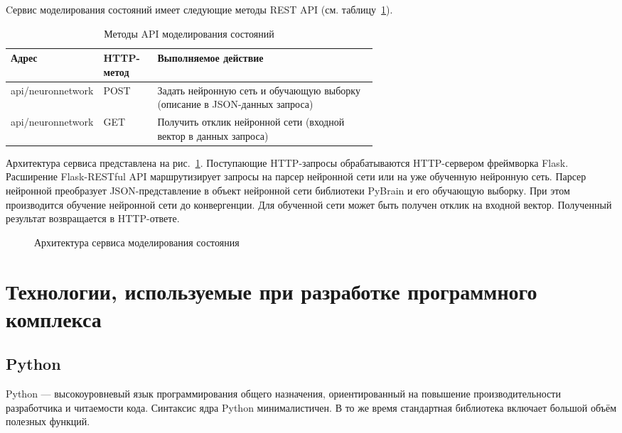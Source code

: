 Cервис моделирования состояний имеет следующие методы REST API (см. таблицу~\ref{tab:neuronnetwork}).
\begin{table} [htbp]
  \centering
  \parbox{15cm}{\caption{Методы API моделирования состояний}\label{tab:neuronnetwork}}
  \begin{center}
  \begin{tabular}{| l | l | p{0.6\linewidth} |}
  \hline
  Адрес & HTTP-метод & Выполняемое действие\\
  \hline
  api/neuronnetwork & POST & Задать нейронную сеть и обучающую выборку (описание в JSON-данных запроса)\\
  \hline
  api/neuronnetwork & GET & Получить отклик нейронной сети (входной вектор в данных запроса)\\
  \hline
  \end{tabular}
  \end{center}
\end{table}

Архитектура сервиса представлена на рис.~\ref{pic:neuronnetwork-arch}.
Поступающие HTTP-запросы обрабатываются HTTP-сервером фреймворка Flask.
Расширение Flask-RESTful API маршрутизирует запросы на парсер нейронной сети или на уже обученную нейронную сеть.
Парсер нейронной преобразует JSON-представление в объект нейронной сети библиотеки PyBrain и его обучающую выборку. 
При этом производится обучение нейронной сети до конвергенции.
Для обученной сети может быть получен отклик на входной вектор.
Полученный результат возвращается в HTTP-ответе.

\begin{figure}[ht]
\caption{Архитектура сервиса моделирования состояния}
\label{pic:neuronnetwork-arch}
\end{figure}

\section{Технологии, используемые при разработке программного комплекса}
\subsection{Python}
Python --- высокоуровневый язык программирования общего назначения, ориентированный на повышение производительности разработчика и читаемости кода. 
Синтаксис ядра Python минималистичен. 
В то же время стандартная библиотека включает большой объём полезных функций.

